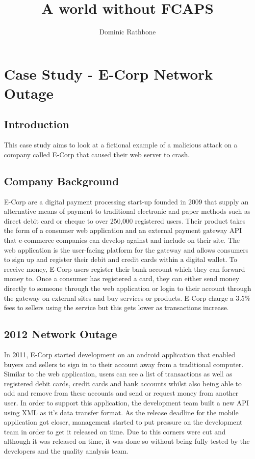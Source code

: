 \documentclass[]{report}
\title{A world without FCAPS}
\author{Dominic Rathbone}
\begin{document}
\maketitle

\chapter{Case Study - E-Corp Network Outage}
\section*{Introduction}
This case study aims to look at a fictional example of a malicious attack on a company called E-Corp that caused their web server to crash. 

\section*{Company Background}
E-Corp are a digital payment processing start-up founded in 2009 that supply an alternative means of payment to traditional electronic and paper methods such as direct debit card or cheque to over 250,000 registered users. Their product takes the form of a consumer web application and an external payment gateway API that e-commerce companies can develop against and include on their site. The web application is the user-facing platform for the gateway and allows consumers to sign up and register their debit and credit cards within a digital wallet. To receive money, E-Corp users register their bank account which they can forward money to. Once a consumer has registered a card, they can either send money directly to someone through the web application or login to their account through the gateway on external sites and buy services or products. E-Corp charge a 3.5\% fees to sellers using the service but this gets lower as transactions increase. 
	
\section*{2012 Network Outage}
In 2011, E-Corp started development on an android application that enabled buyers and sellers to sign in to their account away from a traditional computer. Similar to the web application, users can see a list of transactions as well as registered debit cards, credit cards and bank accounts whilst also being able to add and remove from these accounts and send or request money from another user. In order to support this application, the development team built a new API using XML as it's data transfer format. As the release deadline for the mobile application got closer, management started to put pressure on the development team in order to get it released on time. Due to this corners were cut and although it was released on time, it was done so without being fully tested by the developers and the quality analysis team.
	
\end{document}
